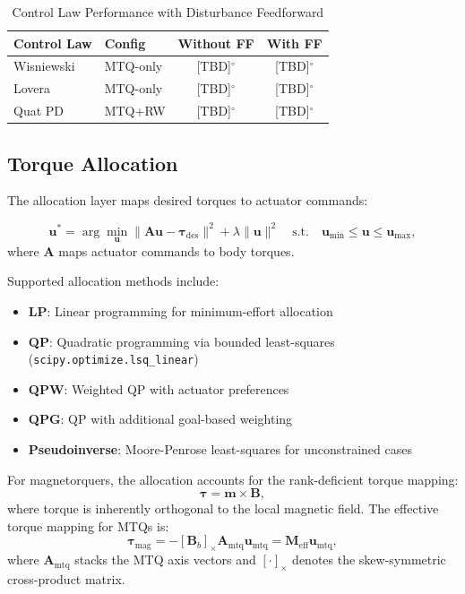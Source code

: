 \documentclass[conference]{IEEEtran}
\begin{document}
\begin{table}[t]
    \centering
    \caption{Control Law Performance with Disturbance Feedforward}
    \label{tab:control_results}
    \begin{tabular}{llcc}
        \toprule
        Control Law & Config & Without FF & With FF \\
        \midrule
        Wisniewski & MTQ-only & [TBD]$^\circ$ & [TBD]$^\circ$ \\
        Lovera & MTQ-only & [TBD]$^\circ$ & [TBD]$^\circ$ \\
        Quat PD & MTQ+RW & [TBD]$^\circ$ & [TBD]$^\circ$ \\
        \bottomrule
    \end{tabular}
\end{table}

\subsection{Torque Allocation}\label{subsec:allocation}

The allocation layer maps desired torques to actuator commands:

\begin{equation}
\mathbf{u}^* = \arg\min_{\mathbf{u}} \|\mathbf{A}\mathbf{u} - \boldsymbol{\tau}_{\text{des}}\|^2 + \lambda\|\mathbf{u}\|^2 \quad \text{s.t.} \quad \mathbf{u}_{\min} \leq \mathbf{u} \leq \mathbf{u}_{\max},
\end{equation}
where $\mathbf{A}$ maps actuator commands to body torques.

Supported allocation methods include:
\begin{itemize}
    \item \textbf{LP}: Linear programming for minimum-effort allocation
    \item \textbf{QP}: Quadratic programming via bounded least-squares (\texttt{scipy.optimize.lsq\_linear})
    \item \textbf{QPW}: Weighted QP with actuator preferences
    \item \textbf{QPG}: QP with additional goal-based weighting
    \item \textbf{Pseudoinverse}: Moore-Penrose least-squares for unconstrained cases
\end{itemize}

For magnetorquers, the allocation accounts for the rank-deficient torque mapping:
\begin{equation}
\boldsymbol{\tau} = \mathbf{m} \times \mathbf{B},
\end{equation}
where torque is inherently orthogonal to the local magnetic field. The effective torque mapping for MTQs is:
\begin{equation}
\boldsymbol{\tau}_{\text{mag}} = -[\mathbf{B}_b]_\times \mathbf{A}_{\text{mtq}} \mathbf{u}_{\text{mtq}} = \mathbf{M}_{\text{eff}} \mathbf{u}_{\text{mtq}},
\end{equation}
where $\mathbf{A}_{\text{mtq}}$ stacks the MTQ axis vectors and $[\cdot]_\times$ denotes the skew-symmetric cross-product matrix.
\end{document}
